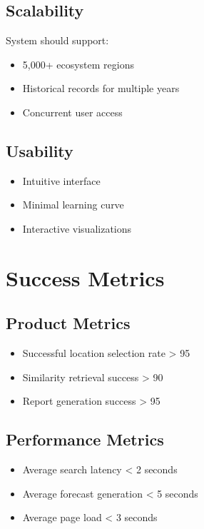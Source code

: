 \documentclass[11pt,a4paper]{article}
\begin{document}
\subsection{Scalability}

System should support:

\begin{itemize}
\item 5,000+ ecosystem regions
\item Historical records for multiple years
\item Concurrent user access
\end{itemize}

\subsection{Usability}

\begin{itemize}
\item Intuitive interface
\item Minimal learning curve
\item Interactive visualizations
\end{itemize}

\section{Success Metrics}

\subsection{Product Metrics}

\begin{itemize}
\item Successful location selection rate > 95%
\item Similarity retrieval success > 90%
\item Report generation success > 95%
\end{itemize}

\subsection{Performance Metrics}

\begin{itemize}
\item Average search latency < 2 seconds
\item Average forecast generation < 5 seconds
\item Average page load < 3 seconds
\end{itemize}
\end{document}
